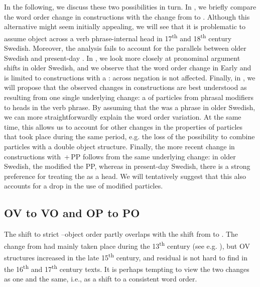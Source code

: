\documentclass[output=paper]{langscibook}
\begin{document}
In the following, we discuss these two possibilities in turn. In , we briefly compare the word order change in  constructions with the change from  to . Although this alternative might seem initially appealing, we will see that it is problematic to assume object  across a verb phrase-internal head in 17\textsuperscript{th} and 18\textsuperscript{th} century Swedish. Moreover, the analysis fails to account for the parallels between older Swedish and present-day . In , we look more closely at pronominal argument shifts in older Swedish, and we observe that the word order change in Early and  is limited to constructions with a :  across negation is not affected. Finally, in , we will propose that the observed changes in  constructions are best understood as resulting from one single underlying change: a  of particles from phrasal modifiers to heads in the verb phrase. By assuming that the  was a phrase in older Swedish, we can more straightforwardly explain the word order variation. At the same time, this allows us to account for other changes in the properties of particles that took place during the same period, e.g. the loss of the possibility to combine  particles with a double object structure. Finally, the more recent change in constructions with \,+\,PP follows from the same underlying change: in older Swedish, the  modified the PP, whereas in present-day Swedish, there is a strong preference for treating the  as a head. We will tentatively suggest that this also accounts for a drop in the use of modified particles.


\subsection{OV to VO and OP to PO}\label{sec:lalu:6.1}

The shift to strict –object order partly overlaps with the shift from  to . The change from  had mainly taken place during the 13\textsuperscript{th} century (see e.g. \citealt{Delsing1999}), but OV structures increased in the late 15\textsuperscript{th} century, and residual  is not hard to find in the 16\textsuperscript{th} and 17\textsuperscript{th} century texts. It is perhaps tempting to view the two changes as one and the same, i.e., as a shift to a consistent  word order. 
\end{document}
